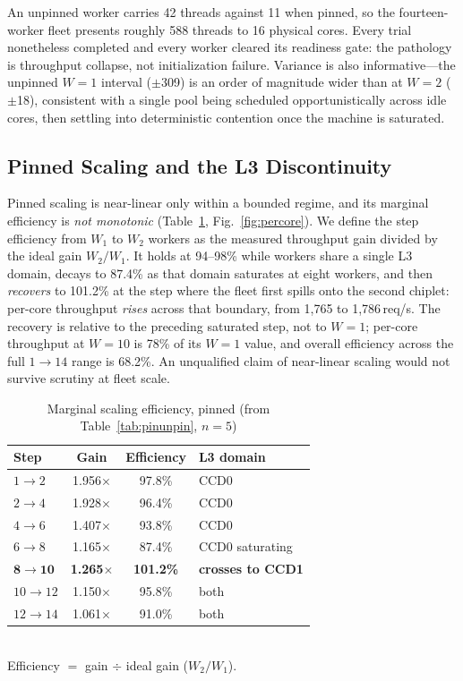 \documentclass[conference]{IEEEtran}
\begin{document}
An unpinned worker carries 42 threads against 11 when pinned, so the fourteen-worker fleet presents roughly 588 threads to 16 physical cores. Every trial nonetheless completed and every worker cleared its readiness gate: the pathology is throughput collapse, not initialization failure. Variance is also informative---the unpinned $W{=}1$ interval ($\pm$309) is an order of magnitude wider than at $W{=}2$ ($\pm$18), consistent with a single pool being scheduled opportunistically across idle cores, then settling into deterministic contention once the machine is saturated.

\subsection{Pinned Scaling and the L3 Discontinuity}
\label{sec:l3}

Pinned scaling is near-linear only within a bounded regime, and its marginal efficiency is \emph{not monotonic} (Table~\ref{tab:marginal}, Fig.~\ref{fig:percore}). We define the step efficiency from $W_1$ to $W_2$ workers as the measured throughput gain divided by the ideal gain $W_2/W_1$. It holds at 94--98\% while workers share a single L3 domain, decays to 87.4\% as that domain saturates at eight workers, and then \emph{recovers} to 101.2\% at the step where the fleet first spills onto the second chiplet: per-core throughput \emph{rises} across that boundary, from 1{,}765 to 1{,}786\,req/s. The recovery is relative to the preceding saturated step, not to $W{=}1$; per-core throughput at $W{=}10$ is 78\% of its $W{=}1$ value, and overall efficiency across the full $1\rightarrow14$ range is 68.2\%. An unqualified claim of near-linear scaling would not survive scrutiny at fleet scale.

\begin{table}[t]
\caption{Marginal scaling efficiency, pinned (from Table~\ref{tab:pinunpin}, $n{=}5$)}
\label{tab:marginal}
\centering\small\setlength{\tabcolsep}{4pt}
\begin{tabular}{@{}lccl@{}}
\toprule
Step & Gain & Efficiency & L3 domain \\
\midrule
$1\rightarrow2$   & 1.956$\times$ & 97.8\%  & CCD0 \\
$2\rightarrow4$   & 1.928$\times$ & 96.4\%  & CCD0 \\
$4\rightarrow6$   & 1.407$\times$ & 93.8\%  & CCD0 \\
$6\rightarrow8$   & 1.165$\times$ & 87.4\%  & CCD0 saturating \\
$\mathbf{8\rightarrow10}$ & \textbf{1.265}$\times$ & \textbf{101.2\%} & \textbf{crosses to CCD1} \\
$10\rightarrow12$ & 1.150$\times$ & 95.8\%  & both \\
$12\rightarrow14$ & 1.061$\times$ & 91.0\%  & both \\
\bottomrule
\end{tabular}
\\[2pt]\footnotesize Efficiency $=$ gain $\div$ ideal gain ($W_2/W_1$).
\end{table}
\end{document}
